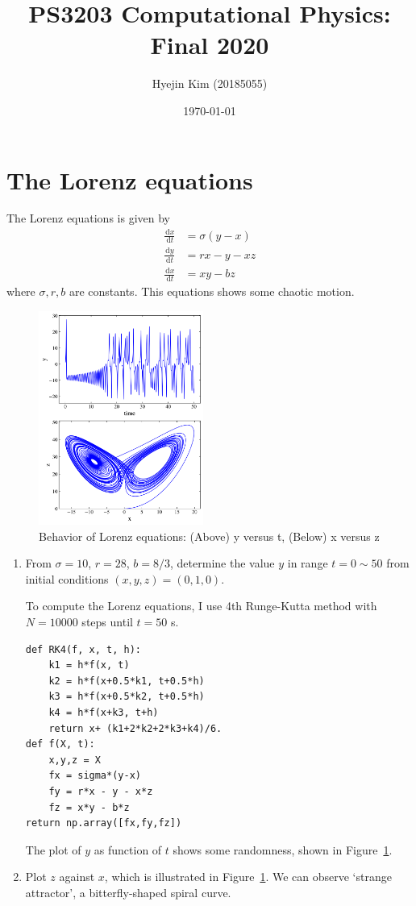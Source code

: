 \documentclass[reprint, nofootinbib]{revtex4-2} %
\newcommand{\ud}{\,\mathrm{d}}
\begin{document}
\title{PS3203 Computational Physics: Final 2020}
\author{Hyejin Kim (20185055)}
\date{\today}

\maketitle
\section{The Lorenz equations}
The Lorenz equations is given by
\begin{align*}
	\frac{\ud x}{\ud t} &= \sigma (y-x)\\
	\frac{\ud y}{\ud t} &= rx - y - xz\\
	\frac{\ud x}{\ud t} &= xy - bz
\end{align*}
where $\sigma, r, b$ are constants. This equations shows some chaotic motion.

\begin{figure}[t]
	\includegraphics[width=0.48\textwidth]{fin_1}
	\caption{Behavior of Lorenz equations: (Above) y versus t, (Below) x versus z}
	\label{fig:fin1}
\end{figure}
 
\begin{enumerate}
	\item From $\sigma = 10$, $r=28$, $b = 8/3$, determine the value $y$ in range $t = 0\sim50$ from initial conditions $(x, y, z) = (0,1,0)$.
	
	To compute the Lorenz equations, I use 4th Runge-Kutta method with $N=10000$ steps until $t = 50$ s. 
\begin{Verbatim}[tabsize=3]
def RK4(f, x, t, h):
	k1 = h*f(x, t)
	k2 = h*f(x+0.5*k1, t+0.5*h)
	k3 = h*f(x+0.5*k2, t+0.5*h)
	k4 = h*f(x+k3, t+h)
	return x+ (k1+2*k2+2*k3+k4)/6.
def f(X, t):
	x,y,z = X
	fx = sigma*(y-x)
	fy = r*x - y - x*z
	fz = x*y - b*z
return np.array([fx,fy,fz])
\end{Verbatim}
	The plot of $y$ as function of $t$ shows some randomness, shown in Figure~\ref{fig:fin1}.
	
	\item Plot $z$ against $x$, which is illustrated in Figure~\ref{fig:fin1}. We can observe `strange attractor', a bitterfly-shaped spiral curve.
\end{enumerate}
\end{document}
